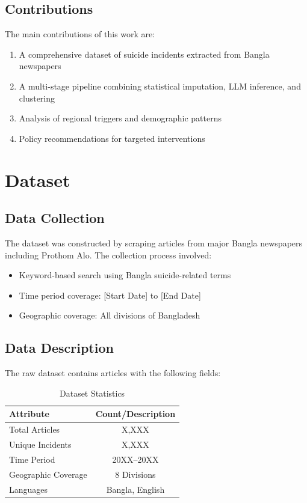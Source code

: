 \documentclass[12pt,a4paper]{article}
\begin{document}
\subsection{Contributions}
The main contributions of this work are:
\begin{enumerate}
    \item A comprehensive dataset of suicide incidents extracted from Bangla newspapers
    \item A multi-stage pipeline combining statistical imputation, LLM inference, and clustering
    \item Analysis of regional triggers and demographic patterns
    \item Policy recommendations for targeted interventions
\end{enumerate}

\section{Dataset}

\subsection{Data Collection}
The dataset was constructed by scraping articles from major Bangla newspapers including Prothom Alo. The collection process involved:

\begin{itemize}
    \item Keyword-based search using Bangla suicide-related terms
    \item Time period coverage: [Start Date] to [End Date]
    \item Geographic coverage: All divisions of Bangladesh
\end{itemize}

\subsection{Data Description}
The raw dataset contains articles with the following fields:

\begin{table}[H]
\centering
\caption{Dataset Statistics}
\label{tab:dataset}
\begin{tabular}{@{}lc@{}}
\toprule
\textbf{Attribute} & \textbf{Count/Description} \\
\midrule
Total Articles & X,XXX \\
Unique Incidents & X,XXX \\
Time Period & 20XX--20XX \\
Geographic Coverage & 8 Divisions \\
Languages & Bangla, English \\
\bottomrule
\end{tabular}
\end{table}
\end{document}
